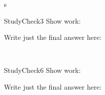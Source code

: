 \documentclass[a4paper,8pt]{book}
\begin{document}
\begin{exam}{s}
\begin{verA}
\renewcommand\chapterlabel{Ch-nuclear}
   \begin{problem*}{StudyCheck3}\vspace{1cm}  
Show work: \begin{solution}[1.0in]\end{solution}
 \vspace{5cm}
Write just the final answer here:\begin{solution} \fillin{1in}{     }\end{solution}\\
\end{problem*}

\renewcommand\chapterlabel{Ch-mole}
   \begin{problem*}{StudyCheck6}\vspace{1cm}  
Show work: \begin{solution}[1.0in]\end{solution}
 \vspace{5cm}
Write just the final answer here:\begin{solution} \fillin{1in}{     }\end{solution}\\
\end{problem*}
%





 
 
  
 


\end{verA}
\end{exam}
\end{document}
